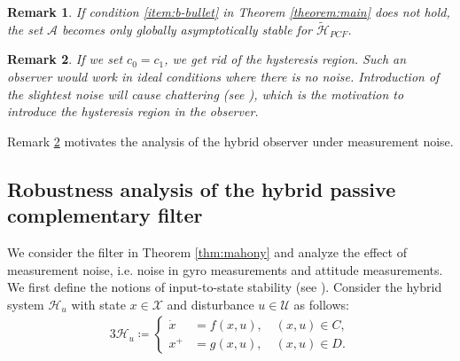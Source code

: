\documentclass{article}
\newtheorem{remark}{Remark}
\begin{document}
\begin{remark}
    If condition \ref{item:b-bullet} in Theorem \ref{theorem:main} does not hold, the set $\mathcal{A}$ becomes only globally asymptotically stable for $\tilde{\mathcal{H}}_{PCF}$. 
\end{remark}
\begin{remark}\label{remark:hysteresis}
    If we set $c_0 = c_1$, we get rid of the hysteresis region. Such an observer would work in ideal conditions where there is no noise. Introduction of the slightest noise will cause chattering (see \cite{quaternion-ricardo}), which is the motivation to introduce the hysteresis region in the observer. 
\end{remark}

\begin{flushleft}
Remark \ref{remark:hysteresis} motivates the analysis of the hybrid observer under measurement noise. 
\end{flushleft}

\subsection{Robustness analysis of the hybrid passive complementary filter}
We consider the filter in Theorem \ref{thm:mahony} and analyze the effect of measurement noise, i.e. noise in gyro measurements and attitude measurements. We first define the notions of input-to-state stability (see \cite{Cai_and_Teel, Khalil}).  Consider the hybrid system $\mathcal{H}_u$ with state $x\in\mathcal{X}$ and disturbance $u\in\mathcal{U}$ as follows:
\begin{alignat}{3}\label{eq:ISS_system}
    \mathcal{H}_u\coloneqq \begin{cases}
        \dot{x} &= f(x,u), \quad (x,u)\in C,\\
        x^+ &= g(x,u), \quad (x,u)\in D.
    \end{cases}
\end{alignat}
\end{document}
